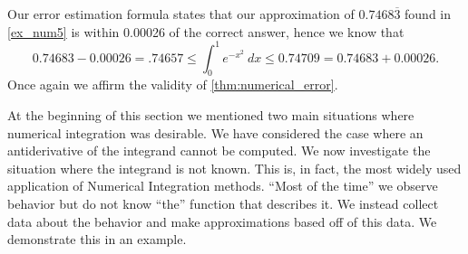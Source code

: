 {Our error estimation formula states that our approximation of $0.7468\overline{3}$ found in \autoref{ex_num5} is within 0.00026 of the correct answer, hence we know that
\[0.74683-0.00026 = .74657 \leq \int_0^1e^{-x^2}\ dx \leq 0.74709 = 0.74683 + 0.00026.\]
Once again we affirm the validity of \autoref{thm:numerical_error}.}


At the beginning of this section we mentioned two main situations where numerical integration was desirable. We have considered the case where an antiderivative of the integrand cannot be computed. We now investigate the situation where the integrand is not known. This is, in fact, the most widely used application of Numerical Integration methods. ``Most of the time'' we observe behavior but do not know ``the'' function that describes it. We instead collect data about the behavior and make approximations based off of this data. We demonstrate this in an example.

